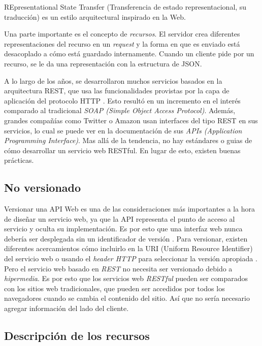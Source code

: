 REpresentational State Transfer (Transferencia de estado representacional, su traducción) es un estilo arquitectural inspirado en la Web. 

Una parte importante es el concepto de \textit{recursos}. 
El servidor crea diferentes representaciones del recurso en un \textit{request} y la forma en que es enviado está desacoplado a cómo está guardado internamente. Cuando un cliente pide por un recurso, se le da una representación con la estructura de JSON.

A lo largo de los años, se desarrollaron muchos servicios basados en la arquitectura REST, que usa las funcionalidades provistas por la capa de aplicación del protocolo HTTP \cite{RestSoap} \cite{IETF}. Esto resultó en un incremento en el interés comparado al tradicional \textit{SOAP (Simple Object Access Protocol)}. Además, grandes compañías como Twitter o Amazon usan interfaces del tipo REST en sus servicios, lo cual se puede ver en la documentación de sus \textit{APIs (Application Programming Interface)}.
Mas allá de la tendencia, no hay estándares o guias de cómo desarrollar un servicio web RESTful. En lugar de esto, existen buenas prácticas.

\subsection[No versionado]{No versionado}

Versionar una API Web es una de las consideraciones más importantes a la hora de diseñar un servicio web, ya que la API representa el punto de acceso al servicio y oculta su implementación. Es por esto que una interfaz web nunca debería ser desplegada sin un identificador de versión \cite{WAPID}. Para versionar, existen diferentes acercamientos cómo incluirlo en la URI (Uniform Resource Identifier) del servicio web o usando el \textit{header HTTP} para seleccionar la versión apropiada \cite{WAPID}. Pero el servicio web basado en \textit{REST} no necesita ser versionado debido a \textit{hipermedia}. Es por esto que los servicios web \textit{RESTful} pueden ser comparados con los sitios web tradicionales, que pueden ser accedidos por todos los navegadores cuando se cambia el contenido del sitio. Así que no sería necesario agregar información del lado del cliente.


\subsection[Descripción de los recursos]{Descripción de los recursos}

